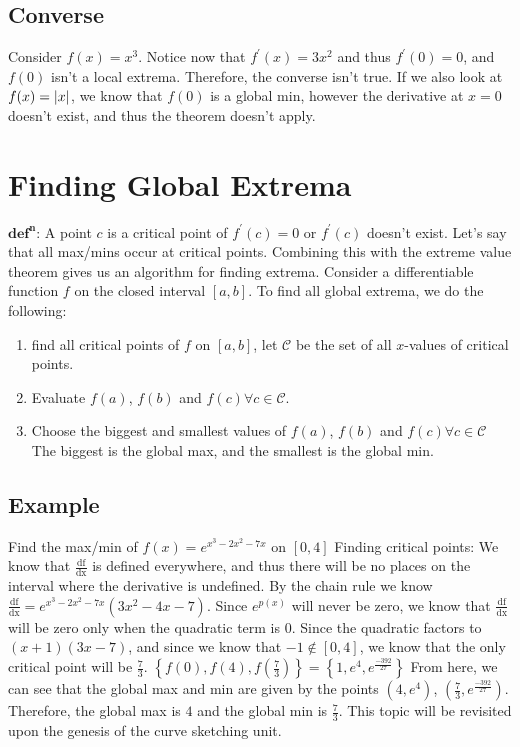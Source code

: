 \documentclass[oneside]{book}
\newcommand\tab[1][1cm]{\hspace*{#1}}
\newcommand\nextline{\newline\tab}
\newcommand{\dfdx}{\frac{\text{df}}{\text{dx}}}
\begin{document}
\subsection{Converse}
\tab Consider $f(x)=x^3$. Notice now that $f^\prime(x)=3x^2$ and thus $f^\prime(0)=0$, and $f(0)$ isn't a local extrema. Therefore, the converse isn't true. If we also look at $f(x)=\lvert x\rvert$, we know that $f(0)$ is a global min, however the derivative at $x=0$ doesn't exist, and thus the theorem doesn't apply.
\section{Finding Global Extrema}
$\mathbf{\text{def}^{\text{n}}}$: A point $c$ is a critical point of $f^\prime(c)=0$ or $f^\prime(c)$ doesn't exist.\nextline
Let's say that all max/mins occur at critical points. Combining this with the extreme value theorem gives us an algorithm for finding extrema. \nextline
Consider a differentiable function $f$ on the closed interval $[a,b]$. To find all global extrema, we do the following:
\begin{enumerate}
\item find all critical points of $f$ on $[a,b]$, let $\mathcal{C}$ be the set of all $x$-values of critical points.
\item Evaluate $f(a)$, $f(b)$ and $f(c) \forall c\in\mathcal{C}$.
\item Choose the biggest and smallest values of $f(a)$, $f(b)$ and $f(c) \forall c\in\mathcal{C}$ \\
The biggest is the global max, and the smallest is the global min.
\end{enumerate}
\subsection{Example}
Find the max/min of $f(x)=e^{x^3-2x^2-7x}$ on $[0,4]$
\nextline
Finding critical points: We know that $\dfdx$ is defined everywhere, and thus there will be no places on the interval where the derivative is undefined.
\nextline
By the chain rule we know $\dfdx=e^{x^3-2x^2-7x}(3x^2-4x-7)$. Since $e^{p(x)}$ will never be zero, we know that $\dfdx$ will be zero only when the quadratic term is 0. Since the quadratic factors to $(x+1)(3x-7)$, and since we know that $-1\not\in[0,4]$, we know that the only critical point will be $\frac{7}{3}$.
\nextline
$\left\{f(0), f(4), f\left(\frac{7}{3}\right) \right\} = \left\{1, e^4, e^\frac{-392}{27} \right\}$
\nextline
From here, we can see that the global max and min are given by the points $(4,e^4)$, $\left(\frac{7}{3}, e^\frac{-392}{27}\right)$. Therefore, the global max is $4$ and the global min is $\frac{7}{3}$.	
\nextline
This topic will be revisited upon the genesis of the curve sketching unit.
\end{document}
